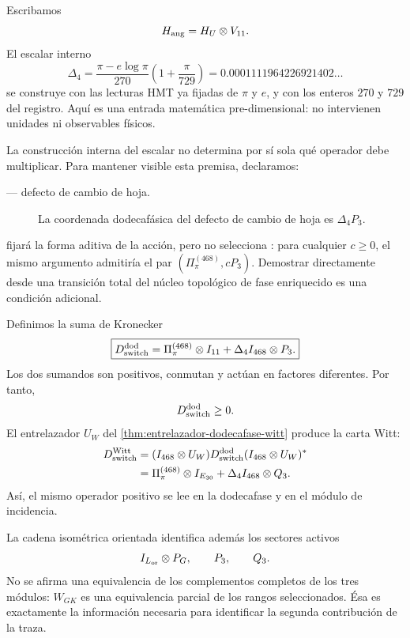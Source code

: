 Escribamos
\[
 H_{\rm ang}=H_U\otimes V_{11}.
\]
El escalar interno
\[
 \Delta_4
 =\frac{\pi-e\log\pi}{270}
 \left(1+\frac\pi{729}\right)
 =0.0001111964226921402\ldots
\]
se construye con las lecturas HMT ya fijadas de \(\pi\) y \(e\), y con los
enteros \(270\) y \(729\) del registro. Aquí es una entrada matemática
pre-dimensional: no intervienen unidades ni observables físicos.

La construcción interna del escalar no determina por sí sola qué operador
debe multiplicar. Para mantener visible esta premisa, declaramos:
\begin{description}
  \item[\HDef --- defecto de cambio de hoja.] La coordenada dodecafásica del defecto
  de cambio de hoja es \(\Delta_4P_3\).
\end{description}
\HAdd fijará la forma aditiva de la acción, pero no selecciona \HDef: para cualquier
\(c\ge0\), el mismo argumento admitiría el par
\((\Pi_\pi^{(468)},cP_3)\). Demostrar \HDef directamente desde una transición
total del núcleo topológico de fase enriquecido es una condición adicional.

Definimos la suma de Kronecker
\[
 \boxed{
 D_{\rm switch}^{\rm dod}
 =\Pi_\pi^{(468)}\otimes I_{11}
 +\Delta_4 I_{468}\otimes P_3.
 }
\]
Los dos sumandos son positivos, conmutan y actúan en factores diferentes.
Por tanto,
\[
 D_{\rm switch}^{\rm dod}\ge0.
\]
El entrelazador \(U_W\) del
\cref{thm:entrelazador-dodecafase-witt} produce la carta Witt:
\[
\begin{aligned}
 D_{\rm switch}^{\rm Witt}
 &=(I_{468}\otimes U_W)
 D_{\rm switch}^{\rm dod}
 (I_{468}\otimes U_W)^*\\
 &=\Pi_\pi^{(468)}\otimes I_{E_{30}}
 +\Delta_4I_{468}\otimes Q_3.
\end{aligned}
\]
Así, el mismo operador positivo se lee en la dodecafase y en el módulo de
incidencia.

La cadena isométrica orientada identifica además los sectores activos
\[
 I_{L_{\rm or}}\otimes P_G,\qquad P_3,\qquad Q_3.
\]
No se afirma una equivalencia de los complementos completos de los tres
módulos: \(W_{GK}\) es una equivalencia parcial de los rangos
seleccionados. Ésa es exactamente la información necesaria para identificar
la segunda contribución de la traza.

